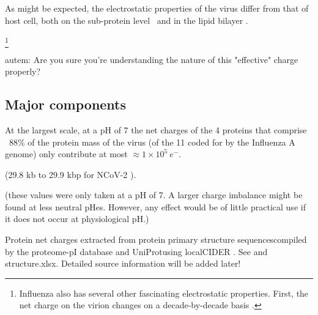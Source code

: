 \documentclass[paper.tex]{subfiles}
\begin{document}
As might be expected, the electrostatic properties of the virus differ from that of host cell, both on the sub-protein level\cite{Icosahedral2019} \footnotemark \ and in the lipid bilayer \cite{Lipid2015} \footnotemark. 



\footnote{Influenza also has several other fascinating electrostatic properties. First, the net charge on the virion changes on a decade-by-decade basis \cite{Dynamics2010}. }

\begin{autem}
	autem: Are you sure you're understanding the nature of this "effective" charge properly?
\end{autem}

\subsection{Major components}

At the largest scale, at a pH of 7 the net charges of the 4 proteins that comprise ~88\% of the protein mass\cite{Quantitative1981} of the virus (of the 11 coded for by the Influenza A genome) only contribute at most  $\approx 1 \times 10^5\  e^-$.

(29.8 kb to 29.9 kbp for NCoV-2 \cite{Genomic2020}).



(these values were only taken at a pH of 7. A larger charge imbalance might be found at less neutral pHes. However, any effect would be of little practical use if it does not occur at physiological pH.)



\begin{sidenote}
Protein net charges extracted from protein primary structure sequences\footnotemark compiled by the proteome-pI database \cite{ProteomepI2017} and UniProt\footnotemark using localCIDER \cite{CIDER2017}. See  and structure.xlsx. Detailed source information will be added later!
\end{sidenote}
\end{document}
